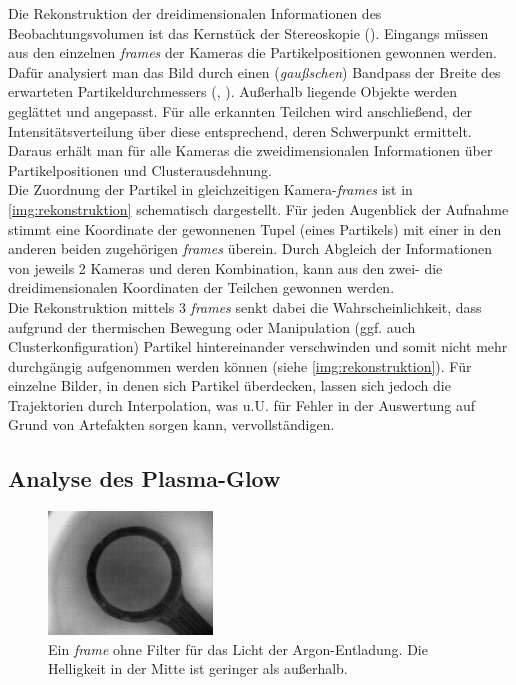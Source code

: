 \documentclass[numbers=noenddot,a4paper]{scrartcl}
\newcommand{\tilt}[1]{\textit{#1}}
\begin{document}
					Die Rekonstruktion der dreidimensionalen Informationen des Beobachtungsvolumen ist das Kernst\"uck der Stereoskopie (\cite{Bonitz10}). Eingangs m\"ussen aus den einzelnen \tilt{frames} der Kameras die Partikelpositionen gewonnen werden. Daf\"ur analysiert man das Bild durch einen (\tilt{gau{\ss}schen}) Bandpass der Breite des erwarteten Partikeldurchmessers (\cite{Crocker96a}, \cite{Ivanov07}). Au{\ss}erhalb liegende Objekte werden gegl\"attet und angepasst. F\"ur alle erkannten Teilchen wird anschlie{\ss}end, der Intensit\"atsverteilung \"uber diese entsprechend, deren Schwerpunkt ermittelt. Daraus erh\"alt man f\"ur alle Kameras die zweidimensionalen Informationen \"uber Partikelpositionen und Clusterausdehnung.\\
					Die Zuordnung der Partikel in gleichzeitigen Kamera-\tilt{frames} ist in \ref{img:rekonstruktion} schematisch dargestellt. F\"ur jeden Augenblick der Aufnahme stimmt eine Koordinate der gewonnenen Tupel (eines Partikels) mit einer in den anderen beiden zugeh\"origen \tilt{frames} \"uberein. Durch Abgleich der Informationen von jeweils 2 Kameras und deren Kombination, kann aus den zwei- die dreidimensionalen Koordinaten der Teilchen gewonnen werden.\\
					Die Rekonstruktion mittels 3 \tilt{frames} senkt dabei die Wahrscheinlichkeit, dass aufgrund der thermischen Bewegung oder Manipulation (ggf. auch Clusterkonfiguration) Partikel hintereinander verschwinden und somit nicht mehr durchg\"angig aufgenommen werden k\"onnen (siehe \ref{img:rekonstruktion}). F\"ur einzelne Bilder, in denen sich Partikel \"uberdecken, lassen sich jedoch die Trajektorien durch Interpolation, was u.U. f\"ur Fehler in der Auswertung auf Grund von Artefakten sorgen kann, vervollst\"andigen.

		\subsection{Analyse des Plasma-Glow} \label{sub:glow}

			\begin{figure}
				\centering
				\includegraphics[width=0.39\textwidth,height=0.3\textwidth]{figs/ringplasmglowoben.png}
				\caption{Ein \tilt{frame} ohne Filter für das Licht der Argon-Entladung. Die Helligkeit in der Mitte ist geringer als außerhalb.}
				\label{img:glow}
                \vspace{-0.5cm}
			\end{figure}
\end{document}
